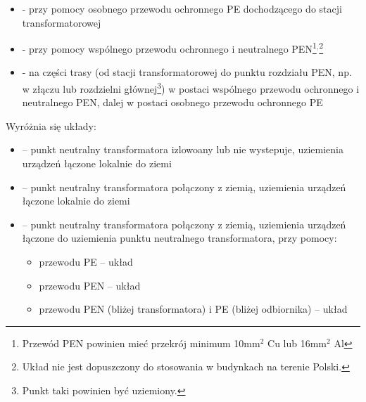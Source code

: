 \begin{itemize}
\begin{itemize}
			\item {} - przy pomocy osobnego przewodu ochronnego PE dochodzącego do stacji transformatorowej
			\item {} - przy pomocy wspólnego przewodu ochronnego i neutralnego PEN\footnote{\label{PEN}Przewód PEN powinien mieć przekrój minimum 10mm$^2$ Cu lub 16mm$^2$ Al}$^,$\footnote{Układ nie jest dopuszczony do stosowania w budynkach na terenie Polski.}
			\item {} - na części trasy (od stacji transformatorowej do punktu rozdziału PEN, np. w złączu lub rozdzielni głównej\footnote{Punkt taki powinien być uziemiony.})
			w postaci wspólnego przewodu ochronnego i neutralnego PEN, dalej w postaci osobnego przewodu ochronnego PE
		\end{itemize}
\end{itemize}
%
Wyróżnia się układy:
\begin{itemize}
	\item {} – punkt neutralny transformatora izlowoany lub nie wystepuje, uziemienia urządzeń łączone lokalnie do ziemi
	\item {} – punkt neutralny transformatora połączony z ziemią, uziemienia urządzeń łączone lokalnie do ziemi
	\item {} – punkt neutralny transformatora połączony z ziemią, uziemienia urządzeń łączone do uziemienia punktu neutralnego transformatora, przy pomocy:
	\begin{itemize}
		\item przewodu PE  – układ 
		\item przewodu PEN – układ 
		\item przewodu PEN (bliżej transformatora) i PE (bliżej odbiornika) – układ 
	\end{itemize}
\end{itemize}

